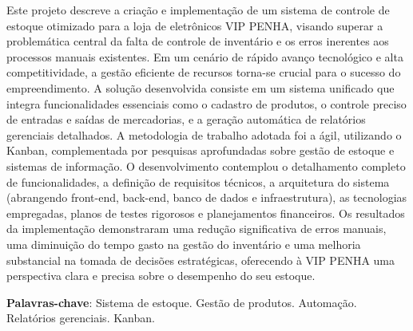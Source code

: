 \documentclass[
	12pt,				%
	openany,			%
	twoside,			%
	a4paper,			%
	english,			%
	brazil				%
	]{abntex2}
\begin{document}
\setlength{\absparsep}{18pt} %
\begin{resumo}
Este projeto descreve a criação e implementação de um sistema de controle de estoque otimizado para a loja de eletrônicos VIP PENHA, visando superar a problemática central da falta de controle de inventário e os erros inerentes aos processos manuais existentes. Em um cenário de rápido avanço tecnológico e alta competitividade, a gestão eficiente de recursos torna-se crucial para o sucesso do empreendimento. A solução desenvolvida consiste em um sistema unificado que integra funcionalidades essenciais como o cadastro de produtos, o controle preciso de entradas e saídas de mercadorias, e a geração automática de relatórios gerenciais detalhados. A metodologia de trabalho adotada foi a ágil, utilizando o Kanban, complementada por pesquisas aprofundadas sobre gestão de estoque e sistemas de informação. O desenvolvimento contemplou o detalhamento completo de funcionalidades, a definição de requisitos técnicos, a arquitetura do sistema (abrangendo front-end, back-end, banco de dados e infraestrutura), as tecnologias empregadas, planos de testes rigorosos e planejamentos financeiros. Os resultados da implementação demonstraram uma redução significativa de erros manuais, uma diminuição do tempo gasto na gestão do inventário e uma melhoria substancial na tomada de decisões estratégicas, oferecendo à VIP PENHA uma perspectiva clara e precisa sobre o desempenho do seu estoque.


 \textbf{Palavras-chave}: Sistema de estoque. Gestão de produtos. Automação. Relatórios gerenciais. Kanban. 
\end{resumo}
\end{document}
